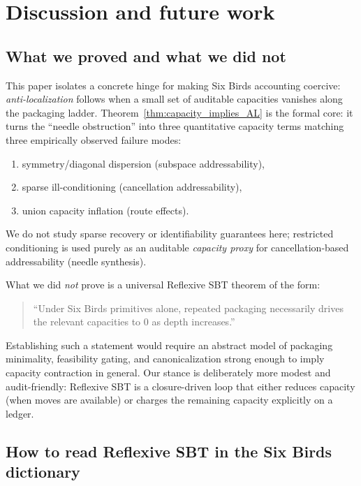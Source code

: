 \documentclass[11pt]{article}
\theoremstyle{plain}
\theoremstyle{definition}
\theoremstyle{remark}
\begin{document}
 \section{Discussion and future work}\label{sec:discussion}

\subsection{What we proved and what we did not}\label{subsec:what_proved}

This paper isolates a concrete hinge for making Six Birds accounting coercive:
\emph{anti-localization} follows when a small set of auditable capacities vanishes along the packaging ladder.
Theorem~\ref{thm:capacity_implies_AL} is the formal core: it turns the ``needle obstruction'' into three quantitative capacity terms matching three empirically observed failure modes:
\begin{enumerate}
  \item symmetry/diagonal dispersion (subspace addressability),
  \item sparse ill-conditioning (cancellation addressability),
  \item union capacity inflation (route effects).
\end{enumerate}
We do not study sparse recovery or identifiability guarantees here; restricted conditioning is used purely as an auditable \emph{capacity proxy} for cancellation-based addressability (needle synthesis).

What we did \emph{not} prove is a universal Reflexive SBT theorem of the form:
\begin{quote}
``Under Six Birds primitives alone, repeated packaging necessarily drives the relevant capacities to \(0\) as depth increases.''
\end{quote}
Establishing such a statement would require an abstract model of packaging minimality, feasibility gating, and canonicalization strong enough to imply capacity contraction in general.
Our stance is deliberately more modest and audit-friendly:
Reflexive SBT is a closure-driven loop that either reduces capacity (when moves are available) or charges the remaining capacity explicitly on a ledger.

\subsection{How to read Reflexive SBT in the Six Birds dictionary}\label{subsec:reflexive_interpretation}
\end{document}
